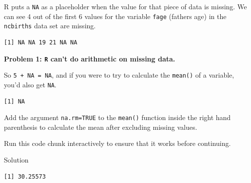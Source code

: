 \documentclass[
  letterpaper,
  DIV=11,
  numbers=noendperiod,
  oneside]{scrreprt}
\newenvironment{Shaded}{\begin{snugshade}}{\end{snugshade}}
\newcommand{\AttributeTok}[1]{\textcolor[rgb]{0.40,0.45,0.13}{#1}}
\newcommand{\ConstantTok}[1]{\textcolor[rgb]{0.56,0.35,0.01}{#1}}
\newcommand{\FunctionTok}[1]{\textcolor[rgb]{0.28,0.35,0.67}{#1}}
\newcommand{\NormalTok}[1]{\textcolor[rgb]{0.00,0.23,0.31}{#1}}
\newcommand{\SpecialCharTok}[1]{\textcolor[rgb]{0.37,0.37,0.37}{#1}}
\begin{document}
R puts a \texttt{NA} as a placeholder when the value for that piece of
data is missing. We can see 4 out of the first 6 values for the variable
\texttt{fage} (fathers age) in the \texttt{ncbirths} data set are
missing.

\begin{Shaded}
\end{Shaded}

\begin{verbatim}
[1] NA NA 19 21 NA NA
\end{verbatim}

\textbf{Problem 1: \texttt{R} can't do arithmetic on missing data.}

So \texttt{5\ +\ NA\ =\ NA}, and if you were to try to calculate the
\texttt{mean()} of a variable, you'd also get \texttt{NA}.

\begin{Shaded}
\end{Shaded}

\begin{verbatim}
[1] NA
\end{verbatim}

\begin{tcolorbox}[enhanced jigsaw, bottomrule=.15mm, colback=white, colframe=quarto-callout-tip-color-frame, toprule=.15mm, coltitle=black, rightrule=.15mm, opacitybacktitle=0.6, colbacktitle=quarto-callout-tip-color!10!white, toptitle=1mm, leftrule=.75mm, breakable, bottomtitle=1mm, titlerule=0mm, title={👉 Fix this error}, arc=.35mm, left=2mm, opacityback=0]

Add the argument \texttt{na.rm=TRUE} to the \texttt{mean()} function
inside the right hand parenthesis to calculate the mean after excluding
missing values.

Run this code chunk interactively to ensure that it works before
continuing.

Solution

\begin{Shaded}
\end{Shaded}

\begin{verbatim}
[1] 30.25573
\end{verbatim}

\end{tcolorbox}
\end{document}

